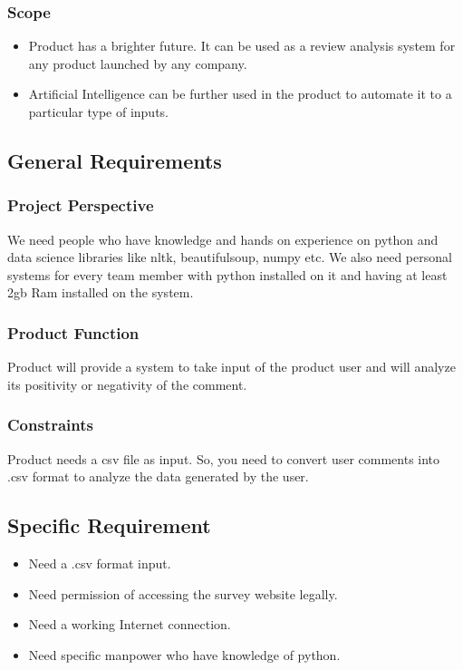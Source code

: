 \subsubsection{Scope}
\begin{itemize}
	\item Product has a brighter future. It can be used as a review analysis system for any product launched by any company.
	\item Artificial Intelligence can be further used in the product to automate it to a particular type of inputs.
\end{itemize}

\subsection{General Requirements}

\subsubsection{Project Perspective}
We need people who have knowledge and hands on experience on python and data science libraries like nltk, beautifulsoup, numpy etc. We also need personal systems for every team member with python installed on it and having at least 2gb Ram installed on the system. 

\subsubsection{Product Function}
Product will provide a system to take input of the product user and will analyze its positivity or negativity of the comment. 

\subsubsection{Constraints}
Product needs a csv file as input. So, you need to convert user comments into .csv format to analyze the data generated by the user. 

\subsection{Specific Requirement}
\begin{itemize}
	\item Need a .csv format input.
	\item Need permission of accessing the survey website legally.
	\item Need a working Internet connection. 
	\item Need specific manpower who have knowledge of python.
\end{itemize}

